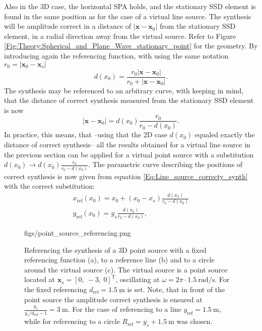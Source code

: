 \documentclass[12pt,a4paper]{article}
\newcommand{\yref}{y_{\mathrm{ref}}}
\newcommand{\dref}{d_{\mathrm{ref}}}
\newcommand{\vx}{\mathbf{x}}
\newcommand{\vxo}{\mathbf{x}_0}
\begin{document}
\vspace{3mm}
Also in the 3D case, the horizontal SPA holds, and the stationary SSD element is found in the same position as for the case of a virtual line source. The synthesis will be amplitude correct in a distance of $| \vx - \vxo| $ from the stationary SSD element, in a radial direction away from the virtual source. Refer to Figure \ref{Fig:Theory:Spherical_and_Plane_Wave_stationary_point} for the geometry. By introducing again the referencing function, with using the same notation $r_0 = | \vxo - \mathbf{x}_s |$ 
\begin{equation}
d(x_0) = \frac{ r_0 | \vx - \vxo|  }{ r_0 + | \vx - \vxo| }.
\end{equation}
The synthesis may be referenced to an arbitrary curve, with keeping in mind, that the distance of correct synthesis measured from the stationary SSD element is now
\begin{equation}
|\vx - \vxo| = d(x_0)\frac{r_0}{r_0 - d(x_0)}.
\end{equation}
In practice, this means, that --using that the 2D case $d(x_0)$ equaled exactly the distance of correct synthesis-- all the results obtained for a virtual line source in the previous section can be applied for a virtual point source with a substitution $d(x_0) \rightarrow d(x_0)\frac{r_0}{r_0 - d(x_0)}$. The parametric curve describing the positions of correct synthesis is now given from equation \eqref{Eq:Line_source_correcty_synth} with the correct substitution:
\begin{eqnarray}
x_{\mathrm{ref}}(x_0) = x_0 + (x_0-x_s) \frac{d(x_0)}{r_0 - d(x_0)} \\
y_{\mathrm{ref}}(x_0) = y_s \frac{d(x_0)}{r_0 - d(x_0)},
\label{Eq:3D_curve}
\end{eqnarray}

\begin{figure}
	\centering
	\begin{overpic}[width = 1\columnwidth ]{figs/point_source_referencing.png}
	\scriptsize
	\end{overpic}
\caption{Referencing the synthesis of a 3D point source with a fixed referencing function (a), to a reference line (b) and to a circle around the virtual source (c). The virtual source is a point source located at $\mathbf{x}_s = [0,\ -3,\ 0]^{\mathrm{T}}$, oscillating at $\omega = 2\pi \cdot 1.5 ~\mathrm{rad/s}$. For the fixed referencing $\dref = 1.5~\mathrm{m}$ is set. Note, that in front of the point source the amplitude correct synthesis is ensured at $\frac{y_s}{y_s/\dref - 1 } = 3~\mathrm{m}$. For the case of referencing to a line $\yref = 1.5~\mathrm{m}$, while for referencing to a circle $R_{\mathrm{ref}} = y_s + 1.5~\mathrm{m}$ was chosen.}
	\label{Fig:Theory:point_source_referencing}
\end{figure}
\end{document}
